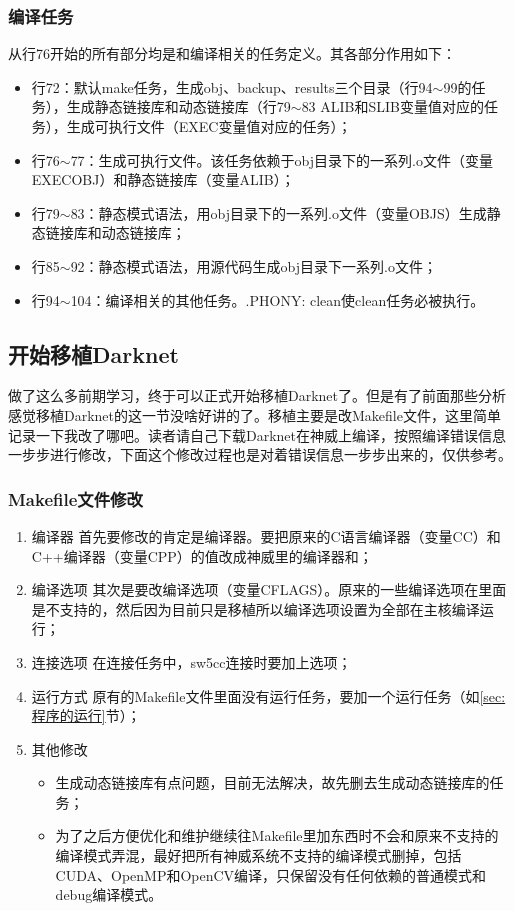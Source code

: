 \subsubsection{编译任务}
从行76开始的所有部分均是和编译相关的任务定义。其各部分作用如下：
\begin{itemize}
	\item 行72：默认make任务，生成obj、backup、results三个目录（行94$\sim$99的任务），生成静态链接库和动态链接库（行79$\sim$83 ALIB和SLIB变量值对应的任务），生成可执行文件（EXEC变量值对应的任务）；
	\item 行76$\sim$77：生成可执行文件。该任务依赖于obj目录下的一系列.o文件（变量EXECOBJ）和静态链接库（变量ALIB）；
	\item 行79$\sim$83：静态模式语法，用obj目录下的一系列.o文件（变量OBJS）生成静态链接库和动态链接库；
	\item 行85$\sim$92：静态模式语法，用源代码生成obj目录下一系列.o文件；
	\item 行94$\sim$104：编译相关的其他任务。.PHONY: clean使clean任务必被执行。
\end{itemize}

\subsection{开始移植Darknet}
做了这么多前期学习，终于可以正式开始移植Darknet了。但是有了前面那些分析感觉移植Darknet的这一节没啥好讲的了。移植主要是改Makefile文件，这里简单记录一下我改了哪吧。读者请自己下载Darknet在神威上编译，按照编译错误信息一步步进行修改，下面这个修改过程也是对着错误信息一步步出来的，仅供参考。

\subsubsection{Makefile文件修改}
\begin{enumerate}
	\item 编译器
	      首先要修改的肯定是编译器。要把原来的C语言编译器（变量CC）和C++编译器（变量CPP）的值改成神威里的编译器和；
	\item 编译选项
	      其次是要改编译选项（变量CFLAGS）。原来的一些编译选项在里面是不支持的，然后因为目前只是移植所以编译选项设置为全部在主核编译运行；
	\item 连接选项
	      在连接任务中，sw5cc连接时要加上选项；
	\item 运行方式
	      原有的Makefile文件里面没有运行任务，要加一个运行任务（如\ref{sec:程序的运行}节）；
	\item 其他修改
	      \begin{itemize}
		      \item 生成动态链接库有点问题，目前无法解决，故先删去生成动态链接库的任务；
		      \item 为了之后方便优化和维护继续往Makefile里加东西时不会和原来不支持的编译模式弄混，最好把所有神威系统不支持的编译模式删掉，包括CUDA、OpenMP和OpenCV编译，只保留没有任何依赖的普通模式和debug编译模式。
	      \end{itemize}
\end{enumerate}

